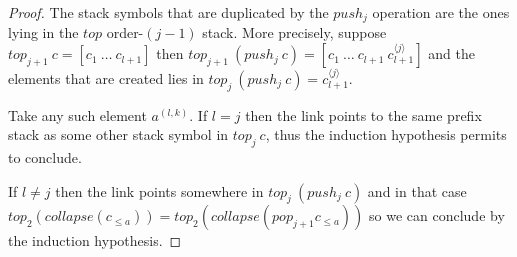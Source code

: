 \documentclass{article}
\newcommand{\prefixof}{\leqslant}
\theoremstyle{remark}
\theoremstyle{definition}
\begin{document}
\begin{proof}
\hrulefill

The stack symbols that are duplicated by the $push_j$ operation are
the ones lying in the $top$ order-$(j-1)$ stack. More precisely,
suppose $top_{j+1}\ c = [c_1\ \ldots\ c_{l+1}]$ then $top_{j+1}\
(push_j\ c) = [c_1\ \ldots\ c_{l+1}\ c_{l+1}^{\langle j \rangle}]$
and the elements that are created lies in $top_j\ (push_j\ c) =
c_{l+1}^{\langle j \rangle}$.

Take any such element $a^{(l,k)}$. If $l=j$ then the link points to
the same prefix stack as some other stack symbol in $top_j\ c$, thus
the induction hypothesis permits to conclude.

If $l \neq j$ then the link points somewhere in $top_j\ (push_j\ c)$
and in that case $top_2( collapse(c_{\prefixof{a}})) = top_2(
collapse( pop_{j+1} c_{\prefixof{a}}))$ so we can conclude by the
induction hypothesis.


\hrulefill

\end{proof}
\end{document}

